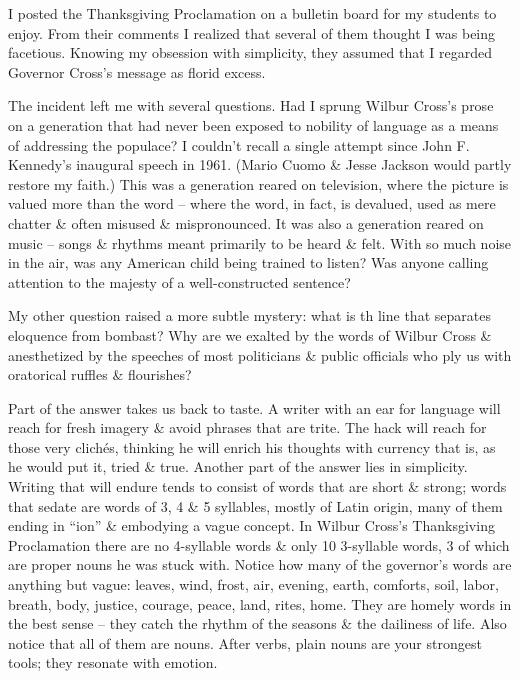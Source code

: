 \documentclass{article}
\numberwithin{equation}{section}
\begin{document}
I posted the Thanksgiving Proclamation on a bulletin board for my students to enjoy. From their comments I realized that several of them thought I was being facetious. Knowing my obsession with simplicity, they assumed that I regarded Governor Cross's message as florid excess.

The incident left me with several questions. Had I sprung Wilbur Cross's prose on a generation that had never been exposed to nobility of language as a means of addressing the populace? I couldn't recall a single attempt since John F. Kennedy's inaugural speech in 1961. (Mario Cuomo \& Jesse Jackson would partly restore my faith.) This was a generation reared on television, where the picture is valued more than the word -- where the word, in fact, is devalued, used as mere chatter \& often misused \& mispronounced. It was also a generation reared on music -- songs \& rhythms meant primarily to be heard \& felt. With so much noise in the air, was any American child being trained to listen? Was anyone calling attention to the majesty of a well-constructed sentence?

My other question raised a more subtle mystery: what is th line that separates eloquence from bombast? Why are we exalted by the words of Wilbur Cross \& anesthetized by the speeches of most politicians \& public officials who ply us with oratorical ruffles \& flourishes?

Part of the answer takes us back to taste. A writer with an ear for language will reach for fresh imagery \& avoid phrases that are trite. The hack will reach for those very clich\'es, thinking he will enrich his thoughts with currency that is, as he would put it, tried \& true. Another part of the answer lies in simplicity. Writing that will endure tends to consist of words that are short \& strong; words that sedate are words of 3, 4 \& 5  syllables, mostly of Latin origin, many of them ending in ``ion'' \& embodying a vague concept. In Wilbur Cross's Thanksgiving Proclamation there are no 4-syllable words \& only 10 3-syllable words, 3 of which are proper nouns he was stuck with. Notice how many of the governor's words are anything but vague: leaves, wind, frost, air, evening, earth, comforts, soil, labor, breath, body, justice, courage, peace, land, rites, home. They are homely words in the best sense -- they catch the rhythm of the seasons \& the dailiness of life. Also notice that all of them are nouns. After verbs, plain nouns are your strongest tools; they resonate with emotion.
\end{document}
